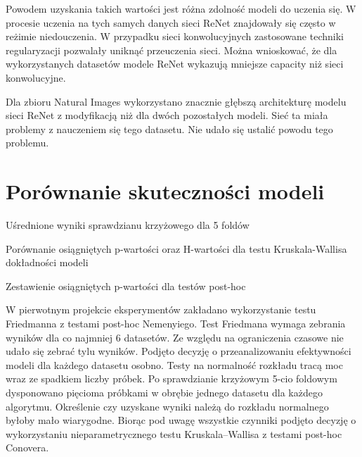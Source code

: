 \documentclass[oneside, mag]{mgr}
\begin{document}
Powodem uzyskania takich wartości jest różna zdolność modeli do uczenia się. W procesie uczenia na tych samych danych sieci ReNet znajdowały się często w reżimie niedouczenia. W przypadku sieci konwolucyjnych zastosowane techniki regularyzacji pozwalały uniknąć przeuczenia sieci. Można wnioskować, że dla wykorzystanych datasetów modele ReNet wykazują mniejsze capacity niż sieci konwolucyjne.

Dla zbioru Natural Images wykorzystano znacznie głębszą architekturę modelu sieci ReNet z modyfikacją niż dla dwóch pozostałych modeli. Sieć ta miała problemy z nauczeniem się tego datasetu. Nie udało się ustalić powodu tego problemu.

\section{Porównanie skuteczności modeli}

\begin{table}[ht]
    \centering
    \caption{Uśrednione wyniki sprawdzianu krzyżowego dla 5 foldów}
    
    \label{table:cross_validation}
\end{table}

\begin{table}[ht]
    \centering
    \caption{Porównanie osiągniętych p-wartości oraz H-wartości dla testu Kruskala-Wallisa dokładności modeli}
    
    \label{table:kruskal}
\end{table}

\begin{table}[ht]
    \centering
    \caption{Zestawienie osiągniętych p-wartości dla testów post-hoc}
    
    \label{table:posthoc}
\end{table}

W pierwotnym projekcie eksperymentów zakładano wykorzystanie testu Friedmanna z testami post-hoc Nemenyiego. Test Friedmana wymaga zebrania wyników dla co najmniej 6 datasetów. Ze względu na ograniczenia czasowe nie udało się zebrać tylu wyników. Podjęto decyzję o przeanalizowaniu efektywności modeli dla każdego datasetu osobno. Testy na normalność rozkładu tracą moc wraz ze spadkiem liczby próbek. Po sprawdzianie krzyżowym 5-cio foldowym dysponowano pięcioma próbkami w obrębie jednego datasetu dla każdego algorytmu. Określenie czy uzyskane wyniki należą do rozkładu normalnego byłoby mało wiarygodne. Biorąc pod uwagę wszystkie czynniki podjęto decyzję o wykorzystaniu nieparametrycznego testu Kruskala–Wallisa z testami post-hoc Conovera. 
\end{document}
